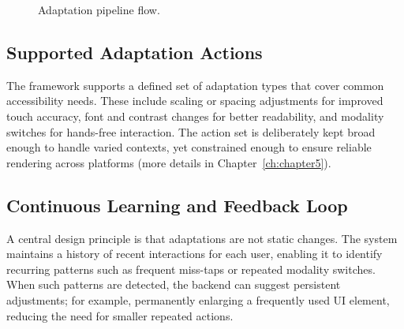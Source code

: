 \begin{figure}[h]
\centering
{}
\caption{Adaptation pipeline flow.}
\label{fig:adaptation-pipeline-flow}
\end{figure}

\subsection{Supported Adaptation Actions}
The framework supports a defined set of adaptation types that cover common accessibility needs. These include scaling or spacing adjustments for improved touch accuracy, font and contrast changes for better readability, and modality switches for hands-free interaction. The action set is deliberately kept broad enough to handle varied contexts, yet constrained enough to ensure reliable rendering across platforms (more details in Chapter~\ref{ch:chapter5}).

\subsection{Continuous Learning and Feedback Loop}
A central design principle is that adaptations are not static changes. The system maintains a history of recent interactions for each user, enabling it to identify recurring patterns such as frequent miss-taps or repeated modality switches. When such patterns are detected, the backend can suggest persistent adjustments; for example, permanently enlarging a frequently used UI element, reducing the need for smaller repeated actions.

